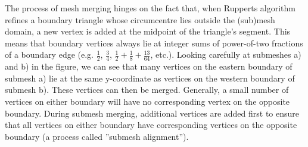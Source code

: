 \documentclass{article}
\begin{document}
The process of mesh merging hinges on the fact that, when Rupperts algorithm refines a boundary triangle whose circumcentre lies outside the (sub)mesh domain, a new vertex is added at the midpoint of the triangle's segment. This means that boundary vertices always lie at integer sums of power-of-two fractions of a boundary edge (e.g. $\frac{1}{2}$, $\frac{3}{4}$, $\frac{1}{2}+\frac{1}{8}+\frac{13}{64}$, etc.). Looking carefully at submeshes a) and b) in the figure, we can see that many vertices on the eastern boundary of submesh a) lie at the same y-coordinate as vertices on the western boundary of submesh b). These vertices can then be merged. Generally, a small number of vertices on either boundary will have no corresponding vertex on the opposite boundary. During submesh merging, additional vertices are added first to ensure that all vertices on either boundary have corresponding vertices on the opposite boundary (a process called ''submesh alignment'').
\end{document}
